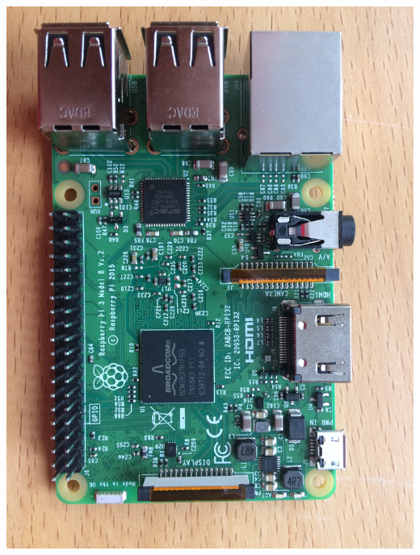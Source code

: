 \documentclass[12pt]{article} %
\begin{document}
\noindent \begin{minipage}{0.33\textwidth}
  \noindent \includegraphics[width=\textwidth]{./photos/Pi1.JPG}

\end{minipage}
\end{document}
